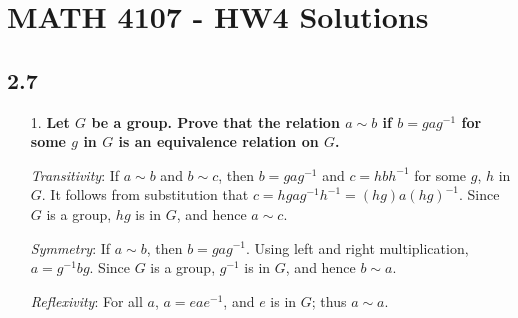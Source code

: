 \documentclass[a4paper,12pt]{article}
\begin{document}
\section*{MATH 4107 - HW4 Solutions}

\subsection*{2.7}
\begin{enumerate}
    \item[1.]
        \boldmath
        \textbf{Let $G$ be a group. Prove that the relation $a \sim b$ if $b = gag^{-1}$ for some $g$ in $G$ is an equivalence relation on $G$.} \par
        \unboldmath
        \textit{Transitivity}: If $a \sim b$ and $b \sim c$, then $b = gag^{-1}$ and $c = hbh^{-1}$ for some $g$, $h$ in $G$. It follows from substitution that $c = h gag^{-1} h^{-1} = (hg) a (hg)^{-1}$. Since $G$ is a group, $hg$ is in $G$, and hence $a \sim c$. \par
        \textit{Symmetry}: If $a \sim b$, then $b = gag^{-1}$. Using left and right multiplication, $a = g^{-1} b g$. Since $G$ is a group, $g^{-1}$ is in $G$, and hence $b \sim a$. \par
        \textit{Reflexivity}: For all $a$, $a = eae^{-1}$, and $e$ is in $G$; thus $a \sim a$.
\end{enumerate}
\end{document}
